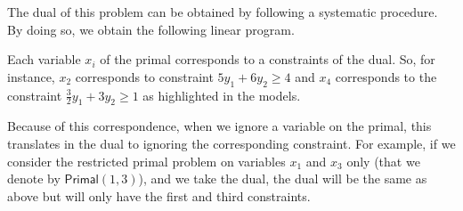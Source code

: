 The dual of this problem can be obtained by following a systematic procedure. By doing so, we obtain the following linear program.
\begin{center}
\end{center}

Each variable $x_i$ of the primal corresponds to a constraints of the dual. So, for instance, $x_2$ corresponds to constraint
$5 y_1 + 6 y_2 \geq 4$ and $x_4$ corresponds to the constraint $\frac{3}{2} y_1 + 3 y_2 \geq 1$ as highlighted in the models.

Because of this correspondence, when we ignore a variable on the primal, this translates in the dual to ignoring the corresponding constraint. 
For example, if we consider the restricted primal problem on variables $x_1$ and $x_3$ only (that we denote by $\textsf{Primal}(1, 3)$), 
and we take the dual, the dual will be the same as above but 
will only have the first and third constraints.


